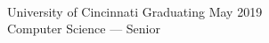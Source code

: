 \newcommand{\eduentry}[2]{%
    {#1 \hfill #2}%
}
\\
\eduentry{University of Cincinnati}{Graduating May 2019} \\
\eduentry{Computer Science --- Senior}{}
